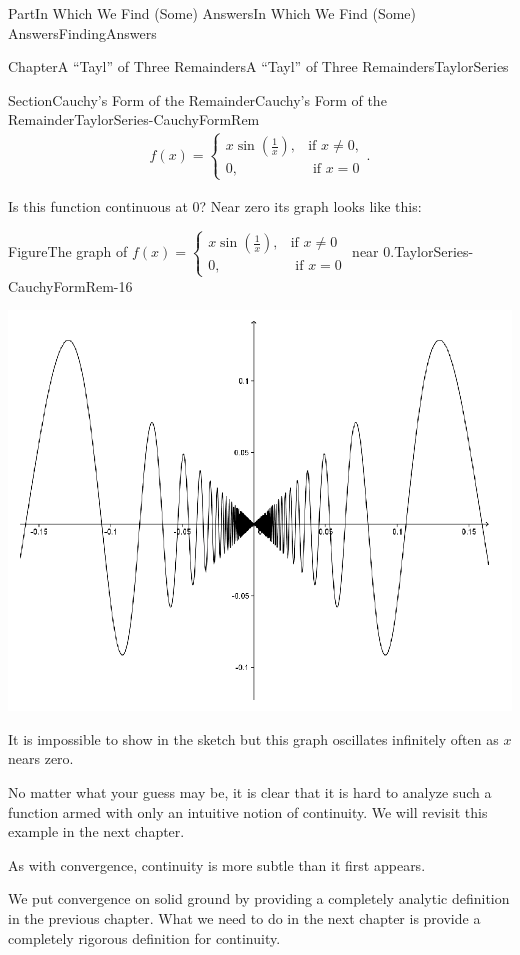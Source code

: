 \documentclass[oneside,10pt,]{book}
\numberwithin{equation}{part}
\newcommand{\amp}{&}
\begin{document}
\begin{partptx}{Part}{In Which We Find (Some) Answers}{}{In Which We Find (Some) Answers}{}{}{FindingAnswers}
\begin{chapterptx}{Chapter}{A ``Tayl'' of Three Remainders}{}{A ``Tayl'' of Three Remainders}{}{}{TaylorSeries}
\begin{sectionptx}{Section}{Cauchy's Form of the Remainder}{}{Cauchy's Form of the Remainder}{}{}{TaylorSeries-CauchyFormRem}
\begin{align}
f(x)= 
\begin{cases}
x\sin\left(\frac{1}{x}\right),\amp \text{if } x\neq 0,\\
0, \amp \text{ if } x=0 
\end{cases} \text{.}\label{xsin1x}
\end{align}
%
\par
Is this function continuous at \(0\)?  Near zero its graph looks like this:%
\begin{figureptx}{Figure}{The graph of \(f(x)= 
\begin{cases}
x\sin\left(\frac{1}{x}\right),\amp \text{if } x\neq 0 \\
0, \amp \text{ if } x=0 
\end{cases} \) near \(0\).}{TaylorSeries-CauchyFormRem-16}{}%
\begin{image}{0.1}{0.8}{0.1}{}%
\includegraphics[width=\linewidth]{external/images/Ch5fig4.png}
\end{image}%
\tcblower
\end{figureptx}%
It is impossible to show in the sketch but this graph oscillates infinitely often as \(x\) nears zero.%
\par
No matter what your guess may be, it is clear that it is hard to analyze such a function armed with only an intuitive notion of continuity.  We will revisit this example in the next chapter.%
\par
As with convergence, continuity is more subtle than it first appears.%
\par
We put convergence on solid ground by providing a completely analytic definition in the previous chapter.  What we need to do in the next chapter is provide a completely rigorous definition for continuity.%

\end{sectionptx}
\end{chapterptx}
\end{partptx}
\end{document}
